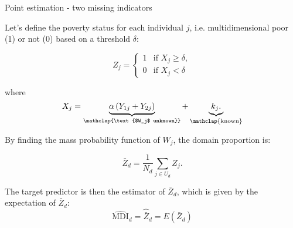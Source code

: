 \documentclass [xcolor=svgnames, t, 9pt] {beamer}
\begin{document}
\begin{frame}{Point estimation - two missing indicators}\label{point}

\vspace{0.2cm}
    
Let's define the poverty status for each individual $j$, i.e. multidimensional poor (1) or not (0) based on a threshold $\delta$: 

\[
Z_{j}=\begin{cases}
1 & \text{if }X_{j}\geq\delta,\\
0 & \text{if }X_{j}<\delta
\end{cases}
\]

\vspace{0.1cm}
\pause 
where 
\[X_{j}=\underbrace{\alpha\left(Y_{1j}+Y_{2j}\right)}_{\mathclap{\text{$W_j$ unknown}}} + \underbrace{k_j.}_{ \mathclap{\text{known}}} \]

\vspace{0.2cm}
\pause 

By finding the mass probability function of $W_j$, the domain proportion is:

\vspace{0.2cm}

$$\bar{Z}_{d}=\frac{1}{N_{d}}\sum_{j\in U_{d}}Z_{j}.$$

\vspace{0.2cm}

The target predictor is then the estimator of $\bar{Z}_{d}$, which is given by the expectation of $\bar{Z}_{d}$:
$$\widehat{\text{MDI}}_d = \hat{\bar{Z}}_{d} = E\left(\bar{Z}_{d}\right)$$

    \hyperlink{AppendixA}{}
\end{frame}
\end{document}
